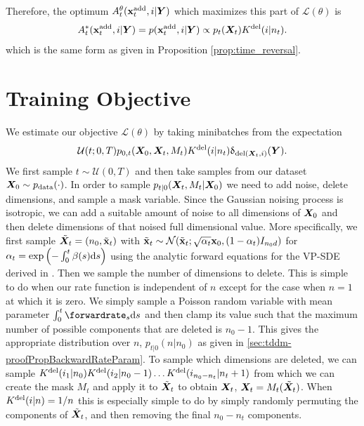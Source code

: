 Therefore, the optimum $A_t^\theta({\mathbf{x}}^{\textup{add}}_t, i | {\bm{Y}})$ which maximizes this part of $\mathcal{L}(\theta)$ is
\begin{equation}
    A_t^*({\mathbf{x}}^{\textup{add}}_t, i | {\bm{Y}}) = p({\mathbf{x}}^{\textup{add}}_t, i | {\bm{Y}}) \propto p_t({\bm{X}}_t) K^{\textup{del}}(i | n_t) . 
\end{equation}
which is the same form as given in Proposition \ref{prop:time_reversal}.



\section{Training Objective}
\label{sec:tddm-ApdxTrainingObjective}
We estimate our objective $\mathcal{L}(\theta)$ by taking minibatches from the expectation 
\begin{equation}
    \mathcal{U}(t; 0, T) p_{0,t}({\bm{X}}_0, {\bm{X}}_t, M_t) K^{\textup{del}}(i | n_t) \updelta_{\text{del}({\bm{X}}_t, i)}({\bm{Y}}).
\end{equation}
We first sample $t \sim \mathcal{U}(0, T)$ and then take samples from our dataset ${\bm{X}}_0 \sim p_{\rm{data}}(\cdot)$. In order to sample $p_{t|0}({\bm{X}}_t, M_t | {\bm{X}}_0)$ we need to add noise, delete dimensions, and sample a mask variable. Since the Gaussian noising process is isotropic, we can add a suitable amount of noise to all dimensions of ${\bm{X}}_0$ and then delete dimensions of that noised full dimensional value. More specifically, we first sample $\tilde{{\bm{X}}}_t = (n_0, \tilde{{\mathbf{x}}}_t)$ with $\tilde{{\mathbf{x}}}_t \sim \mathcal{N}(\tilde{{\mathbf{x}}}_t; \sqrt{\alpha_t} {\mathbf{x}}_0, (1 - \alpha_t) I_{n_0 d})$ for $\alpha_t = \text{exp}\left( - \int_0^t \beta(s) \mathrm{d} s \right)$ using the analytic forward equations for the VP-SDE derived in \cite{song2020score}. Then we sample the number of dimensions to delete. This is simple to do when our rate function is independent of $n$ except for the case when $n=1$ at which it is zero. We simply sample a Poisson random variable with mean parameter $\int_0^t \forwardrate_s \rmd s$ and then clamp its value such that the maximum number of possible components that are deleted is $n_0 - 1$. This gives the appropriate distribution over $n$, $p_{t|0}(n | n_0)$ as given in \cref{sec:tddm-proofPropBackwardRateParam}. To sample which dimensions are deleted, we can sample $K^{\textup{del}}(i_1 | n_0) K^{\textup{del}}(i_2 | n_0-1) \dots K^{\textup{del}}(i_{n_0 - n_t} | n_t+1)$ from which we can create the mask $M_t$ and apply it to $\tilde{{\bm{X}}}_t$ to obtain ${\bm{X}}_t$, ${\bm{X}}_t = M_t(\tilde{{\bm{X}}}_t)$. When $K^{\textup{del}}(i | n) = 1/n$ this is especially simple to do by simply randomly permuting the components of $\tilde{{\bm{X}}}_t$, and then removing the final $n_0 - n_t$ components.\\

